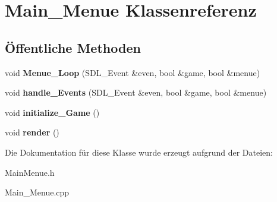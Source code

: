 \hypertarget{class_main___menue}{\section{Main\-\_\-\-Menue Klassenreferenz}
\label{class_main___menue}
}
\subsection*{Öffentliche Methoden}
\begin{DoxyCompactItemize}
\item 
\hypertarget{class_main___menue_aa60a21b72ad952bb630c7d1d6d983b1f}{void {\bfseries Menue\-\_\-\-Loop} (S\-D\-L\-\_\-\-Event \&even, bool \&game, bool \&menue)}\label{class_main___menue_aa60a21b72ad952bb630c7d1d6d983b1f}

\item 
\hypertarget{class_main___menue_af1677a4b1a78c2e1f290278e070b95a7}{void {\bfseries handle\-\_\-\-Events} (S\-D\-L\-\_\-\-Event \&even, bool \&game, bool \&menue)}\label{class_main___menue_af1677a4b1a78c2e1f290278e070b95a7}

\item 
\hypertarget{class_main___menue_aed4976d8260e9ddc97a363cc9db0569d}{void {\bfseries initialize\-\_\-\-Game} ()}\label{class_main___menue_aed4976d8260e9ddc97a363cc9db0569d}

\item 
\hypertarget{class_main___menue_accf9d040d93aa3a1fe85b9fc9d6d8732}{void {\bfseries render} ()}\label{class_main___menue_accf9d040d93aa3a1fe85b9fc9d6d8732}

\end{DoxyCompactItemize}


Die Dokumentation für diese Klasse wurde erzeugt aufgrund der Dateien\-:\begin{DoxyCompactItemize}
\item 
Main\-Menue.\-h\item 
Main\-\_\-\-Menue.\-cpp\end{DoxyCompactItemize}
